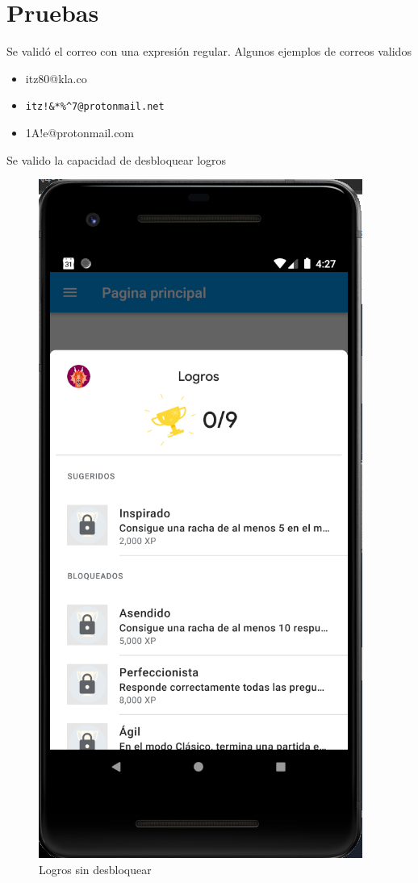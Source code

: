 \documentclass{article}
\begin{document}
\section{Pruebas}%
Se validó el correo con una expresión regular. Algunos ejemplos de correos validos
\begin{itemize}
	\item itz80@kla.co
	\item \verb |itz!&*%
	\item 1A!e@protonmail.com
\end{itemize}
Se valido la capacidad de desbloquear logros
\begin{figure}[H]
    \centering
    \includegraphics[scale=0.8]{imgs/Imp/Logros}
    \caption{Logros sin desbloquear}
\end{figure}
\end{document}
